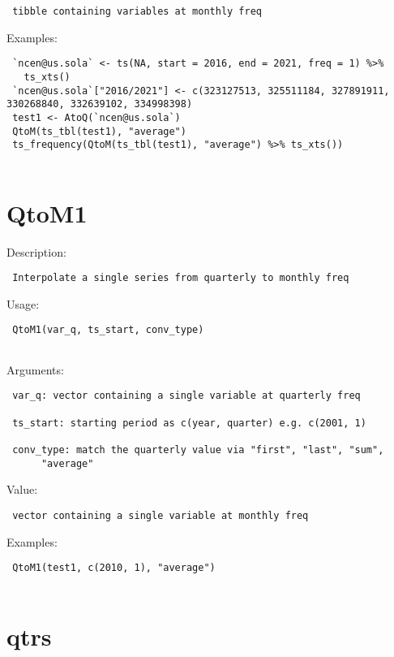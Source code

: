 \documentclass[
  letterpaper,
  DIV=11,
  numbers=noendperiod]{scrreport}
\begin{document}
\begin{verbatim}
 tibble containing variables at monthly freq
\end{verbatim}

Examples:

\begin{verbatim}
 `ncen@us.sola` <- ts(NA, start = 2016, end = 2021, freq = 1) %>% 
   ts_xts()
 `ncen@us.sola`["2016/2021"] <- c(323127513, 325511184, 327891911, 330268840, 332639102, 334998398)
 test1 <- AtoQ(`ncen@us.sola`)
 QtoM(ts_tbl(test1), "average")
 ts_frequency(QtoM(ts_tbl(test1), "average") %>% ts_xts())
 
\end{verbatim}

\section{QtoM1}\label{qtom1}

Description:

\begin{verbatim}
 Interpolate a single series from quarterly to monthly freq
\end{verbatim}

Usage:

\begin{verbatim}
 QtoM1(var_q, ts_start, conv_type)
 
\end{verbatim}

Arguments:

\begin{verbatim}
 var_q: vector containing a single variable at quarterly freq

 ts_start: starting period as c(year, quarter) e.g. c(2001, 1)

 conv_type: match the quarterly value via "first", "last", "sum",
      "average"
\end{verbatim}

Value:

\begin{verbatim}
 vector containing a single variable at monthly freq
\end{verbatim}

Examples:

\begin{verbatim}
 QtoM1(test1, c(2010, 1), "average")
 
\end{verbatim}

\section{qtrs}\label{qtrs}
\end{document}
